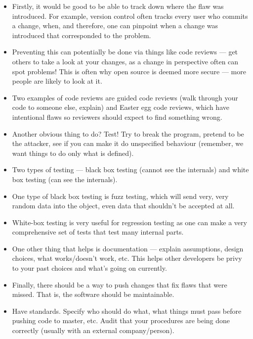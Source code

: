 \documentclass{article}
\begin{document}
\begin{itemize}
        \begin{itemize}
            \item Firstly, it would be good to be able to track down where the flaw was introduced.  For example, version control often tracks every user who commits a change, when, and therefore, one can pinpoint when a change was introduced that corresponded to the problem.
            \item Preventing this can potentially be done via things like code reviews --- get others to take a look at your changes, as a change in perspective often can spot problems!  This is often why open source is deemed more secure --- more people are likely to look at it.
            \item Two examples of code reviews are guided code reviews (walk through your code to someone else, explain) and Easter egg code reviews, which have intentional flaws so reviewers should expect to find something wrong.
            \item Another obvious thing to do?  Test!  Try to break the program, pretend to be the attacker, see if you can make it do unspecified behaviour (remember, we want things to do only what is defined).
            \item Two types of testing --- black box testing (cannot see the internals) and white box testing (can see the internals).
            \item One type of black box testing is fuzz testing, which will send very, very random data into the object, even data that shouldn't be accepted at all.
            \item White-box testing is very useful for regression testing as one can make a very comprehensive set of tests that test many internal parts.
            \item One other thing that helps is documentation --- explain assumptions, design choices, what works/doesn't work, etc.  This helps other developers be privy to your past choices and what's going on currently.
            \item Finally, there should be a way to push changes that fix flaws that were missed.  That is, the software should be maintainable.
            \item Have standards.  Specify who should do what, what things must pass before pushing code to master, etc.  Audit that your procedures are being done correctly (usually with an external company/person).
        \end{itemize}
\end{itemize}
\end{document}
